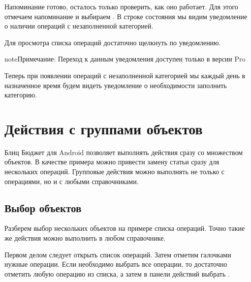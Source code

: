 \documentclass[a4paper,10pt,russian]{sphinxmanual}
\begin{document}
Напоминание готово, осталось только проверить, как оно работает. Для этого отмечаем напоминание и выбираем
. В строке состояния мы видим уведомление о наличии операций с незаполненной категорией.

\noindent{}
\noindent{}
\noindent{}

Для просмотра списка операций достаточно щелкнуть по уведомлению.

\begin{sphinxadmonition}{note}{Примечание:}
Переход к данным уведомления доступен только в версии Pro
\end{sphinxadmonition}

Теперь при появлении операций с незаполненной категорией мы каждый день в назначенное время
будем видеть уведомление о необходимости заполнить категорию.


\chapter{Действия с группами объектов}
\label{\detokenize{bulk-actions:chapter-bulk-actions}}\label{\detokenize{bulk-actions:id1}}\label{\detokenize{bulk-actions::doc}}
Блиц Бюджет для Android позволяет выполнять действия сразу со множеством объектов. В качестве примера можно привести замену
статьи сразу для нескольких операций. Групповые действия можно выполнять не только с операциями, но и с
любыми справочниками.


\section{Выбор объектов}
\label{\detokenize{bulk-actions:id2}}
Разберем выбор нескольких объектов на примере списка операций. Точно такие же действия можно выполнить в
любом справочнике.

\noindent{}
\noindent{}
\noindent{}

Первом делом следует открыть список операций. Затем отметим галочками нужные операции. Если необходимо выбрать все
операции, то достаточно отметить любую операцию из списка, а затем в панели действий выбрать .
\end{document}
